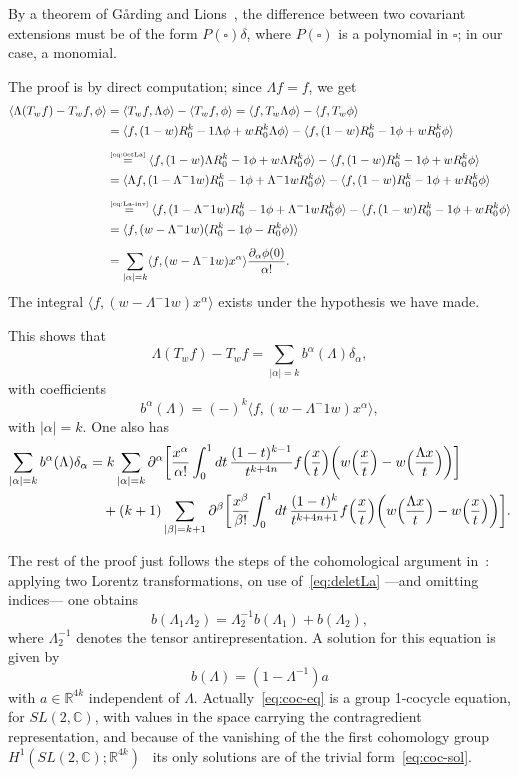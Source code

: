 \documentclass[a4paper,12pt]{article}
\renewcommand{\a}{\alpha}          %
\renewcommand{\b}{\beta}           %
\newcommand{\C}{\mathbb{C}}        %
\newcommand{\del}{\partial}        %
\newcommand{\dl}{\delta}           %
\newcommand{\La}{\Lambda}          %
\newcommand{\R}{\mathbb{R}}        %
\newcommand{\7}{\dagger}           %
\def\<#1,#2>{\langle#1,#2\rangle}  %
\theoremstyle{plain}
\theoremstyle{definition}
\begin{document}
By a theorem of G{\aa}rding and Lions~\cite{SwFr}, the difference
between two covariant extensions must be of the form $P(\square)\dl$,
where $P(\square)$ is a polynomial in $\square$; in our case, a
monomial.

The proof is by direct computation; since $\La f = f$, we get
\begin{align*}
\<\La(T_w f) - T_w f,\phi>
&= \<T_w f,\La\phi> - \<T_w f, \phi> = \<f,T_w\La\phi> - \<f, T_w \phi>
\\
&= \<f, (1-w) R_0^{k-1}\La\phi + w R_0^k \La\phi >
- \<f, (1-w) R_0^{k-1}\phi + w R_0^k \phi>
\\[2mm]
&\stackrel{\mbox{\tiny\eqref{eq:0etLa}}}{=}
\<f, (1-w)\La R_0^{k-1}\phi + w\La R_0^k\phi > -
\<f, (1-w) R_0^{k-1}\phi + w R_0^k \phi>
\\
&= \<\La f, (1-\La^{-1}w) R_0^{k-1}\phi + \La^{-1}w R_0^k\phi > -
\<f, (1-w) R_0^{k-1}\phi + w R_0^k \phi>
\\[2mm]
&\stackrel{\mbox{\tiny\eqref{eq:La-inv}}}{=}
\<f, (1-\La^{-1}w) R_0^{k-1}\phi + \La^{-1}w R_0^k\phi > - \<f, (1-w)
R_0^{k-1}\phi + w R_0^k \phi>
\\
&= \<f, (w - \La^{-1}w) (R_0^{k-1}\phi - R_0^k \phi)>
\\[1.5mm]
&= \sum_{|\a|=k}\<f, (w - \La^{-1}w)x^\a>
\frac{\del_\a \phi (0)}{\a!}.
\end{align*}
The integral $\<f, (w - \La^{-1}w)x^\a>$ exists under the hypothesis
we have made.

This shows that
$$
\La(T_w f) - T_w f = \sum_{|\a|=k} b^\a(\La) \delta_{\a},
$$
with coefficients
$$
b^\a(\La) = (-)^k \<f, (w - \La^{-1}w)x^\a>,
$$
with $|\a|=k$. One also has
\begin{align*}
\sum_{|\a|=k} b^\a(\La) \delta_{\a}
&= k \sum_{|\a|=k} \del^\a \biggl[ \frac{x^\a}{\a!}
\int_0^1 dt\, \frac{(1-t)^{k-1}}{t^{k+4n}} f\Bigl(\frac{x}{t}\Bigr)
\biggl(w\Bigl(\frac{x}{t}\Bigr) - w\Bigl(\frac{\La x}{t}\Bigr)\biggr)
\biggr]
\\
&\quad + (k+1) \sum_{|\b|=k+1} \del^\b \biggl[ \frac{x^\b}{\b!}
\int_0^1 dt\, \frac{(1-t)^k}{t^{k+4n+1}} f\Bigl(\frac{x}{t}\Bigr)
\biggl(w\Bigl(\frac{\La x}{t}\Bigr) - w\Bigl(\frac{x}{t}
\Bigr)\biggr)\biggr].
\end{align*}

The rest of the proof just follows the steps of the cohomological
argument in~\cite{PoSt}: applying two Lorentz transformations, on use
of~\eqref{eq:deletLa} ---and omitting indices--- one obtains
\begin{equation}
b(\La_1\La_2) = \La_2^{-1}b(\La_1) + b(\La_2),
\label{eq:coc-eq}
\end{equation}
where $\La_2^{-1}$ denotes the tensor antirepresentation. A solution
for this equation is given by
\begin{equation}
b(\La) = (1 - \La^{-1})a
\label{eq:coc-sol}
\end{equation}
with $a\in\R^{4k}$ independent of $\La$. Actually~\eqref{eq:coc-eq} is a group
1-cocycle equation, for $SL(2,\C)$, with values in the space carrying the
contragredient representation, and because of the vanishing of the
the first cohomology group $H^1(SL(2,\C);\R^{4k})$~\cite{Wigner} its
only solutions are of the trivial form~\eqref{eq:coc-sol}. 
\end{document}
